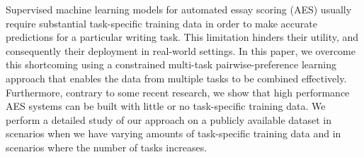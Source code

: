 Supervised machine learning models for automated essay scoring (AES) usually require substantial task-specific training data in order to make accurate predictions for a particular writing task. This limitation hinders their utility, and consequently their deployment in real-world settings. In this paper, we overcome this shortcoming using a constrained multi-task pairwise-preference learning approach that enables the data from multiple tasks to be combined effectively. Furthermore, contrary to some recent research, we show that high performance AES systems can be built with little or no task-specific training data. We perform a detailed study of our approach on a publicly available dataset in scenarios when we have varying amounts of task-specific training data and in scenarios where the number of tasks increases.
